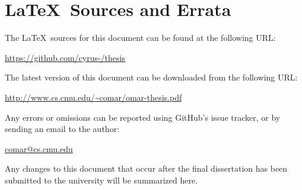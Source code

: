 \newpage
\section*{\LaTeX~Sources and Errata}
\noindent
The \LaTeX~sources for this document can be found at the following URL:
\begin{center}
\url{https://github.com/cyrus-/thesis}
\end{center}
The latest version of this document can be downloaded from the following URL:
\begin{center}
\url{http://www.cs.cmu.edu/~comar/omar-thesis.pdf}
\end{center}
Any errors or omissions can be reported using GitHub's issue tracker, or by sending an email to the author:
\begin{center}
\url{comar@cs.cmu.edu}
\end{center}
Any changes to this document that occur after the final dissertation  has been submitted to the university will be summarized here.
